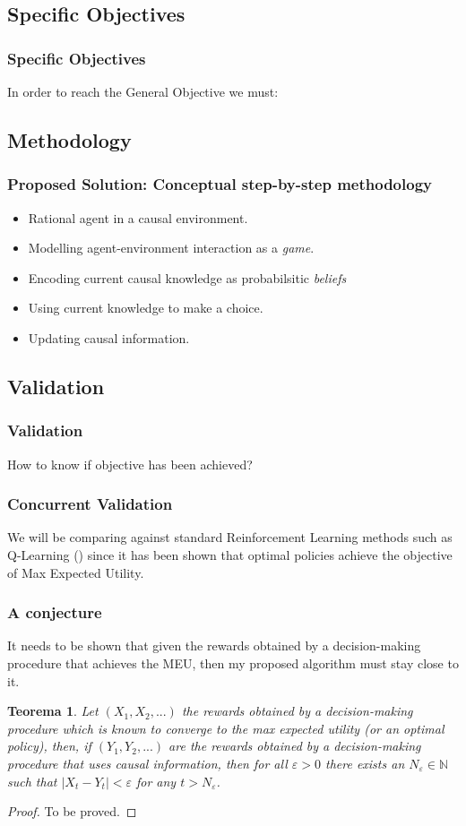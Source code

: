 \documentclass{beamer}
\theoremstyle{plain}
\newtheorem{teo}{Teorema}
\begin{document}
	\subsection{Specific Objectives}
	\begin{frame}
	\frametitle{Specific Objectives}
	In order to reach the General Objective we must:
	\begin{enumerate}
	
	\end{enumerate}
	\end{frame}
	
\subsection{Methodology}
\begin{frame}
\frametitle{Proposed Solution: Conceptual step-by-step methodology}
\begin{itemize}
\item Rational agent in a causal environment.
\item Modelling agent-environment interaction as a \textit{game}.
\item Encoding current causal knowledge as probabilsitic \textit{beliefs}
\item Using current knowledge to make a choice.
\item Updating causal information.
\end{itemize}
\end{frame}

\subsection{Validation}
\begin{frame}
\frametitle{Validation}
How to know if objective has been achieved?
\end{frame}

\begin{frame}
\frametitle{Concurrent Validation}
We will be comparing against standard Reinforcement Learning methods such as Q-Learning (\cite{watkins1992q}) since it has been shown that optimal policies achieve the objective of Max Expected Utility.
\end{frame}

\begin{frame}
\frametitle{A conjecture}
It needs to be shown that given the rewards obtained by a decision-making procedure that achieves the MEU, then my proposed algorithm must stay close to it.
\begin{teo}
Let $(X_1,X_2,...)$ the rewards obtained by a decision-making procedure which is known to converge to the max expected utility (or an optimal policy), then, if $(Y_1, Y_2,...)$ are the rewards obtained by a decision-making procedure that uses causal information, then for all $\varepsilon > 0$ there exists an $N_\varepsilon \in \mathbb{N}$ such that $ | X_t - Y_t | < \varepsilon$ for any $t > N_\varepsilon$. 
\end{teo}
\begin{proof}
To be proved.
\end{proof}
\end{frame}
\end{document}
